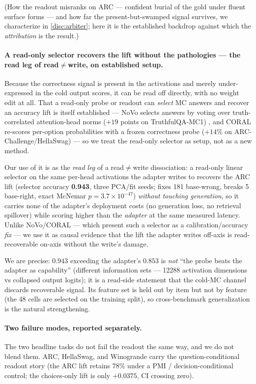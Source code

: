 (How the readout misranks on ARC --- confident burial of the gold under fluent
surface forms --- and how far the present-but-swamped signal survives, we
characterize in \cref{disc:arbiter}; here it is the established backdrop against
which the \emph{attribution} is the result.)

\paragraph{A read-only selector recovers the lift without the pathologies --- the
read leg of read${\neq}$write, on established setup.}
Because the correctness signal is present in the activations and merely
under-expressed in the cold output scores, it can be read off directly, with no
weight edit at all. That a read-only probe or readout can \emph{select} MC answers
and recover an accuracy lift is itself established --- NoVo selects answers by
voting over truth-correlated attention-head norms ($+19$ points on TruthfulQA-MC1)
\citep{NoVo}, and CORAL re-scores per-option probabilities with a frozen correctness
probe ($+14\%$ on ARC-Challenge/HellaSwag) \citep{CORAL} --- so we treat the
read-only selector as setup, not as a new method.

Our use of it is as the \emph{read leg} of a read${\neq}$write dissociation: a
read-only linear selector on the same per-head activations the adapter writes to
recovers the ARC lift (selector accuracy \textbf{0.943}, three PCA/fit seeds; fixes 181
base-wrong, breaks 5 base-right, exact McNemar $p=3.7\times10^{-47}$)
\emph{without touching generation}, so it carries none of the adapter's deployment
costs (no generation loss, no retrieval spillover) while scoring higher than the
\emph{adapter} at the same measured latency. Unlike NoVo/CORAL --- which present
such a selector as a calibration/accuracy \emph{fix} --- we use it as causal
evidence that the lift the adapter writes off-axis is read-recoverable on-axis
without the write's damage.

We are precise: $0.943$ exceeding the adapter's $0.853$ is \emph{not} ``the probe
beats the adapter as capability'' (different information sets --- 12288 activation
dimensions vs collapsed output logits); it is a read-side statement that the cold-MC
channel discards recoverable signal. Its feature set is held out by item but not by
feature (the 48 cells are selected on the training split), so cross-benchmark
generalization is the natural strengthening.

\paragraph{Two failure modes, reported separately.}
The two headline tasks do not fail the readout the same way, and we do not blend
them. ARC, HellaSwag, and Winogrande carry the question-conditional readout story
(the ARC lift retains 78\% under a PMI / decision-conditional control; the
choices-only lift is only $+0.0375$, CI crossing zero).

